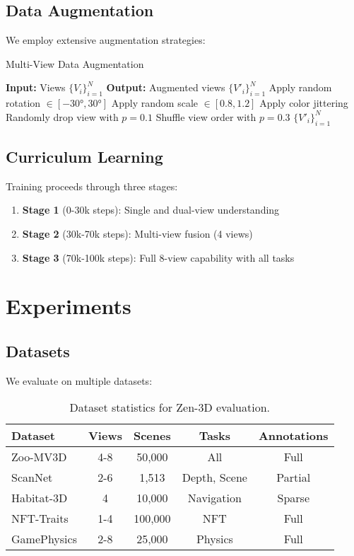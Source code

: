 \documentclass[11pt,a4paper]{article}
\begin{document}
\subsection{Data Augmentation}

We employ extensive augmentation strategies:

\begin{algorithm}
\caption{Multi-View Data Augmentation}
\begin{algorithmic}
\STATE \textbf{Input:} Views $\{V_i\}_{i=1}^N$
\STATE \textbf{Output:} Augmented views $\{V'_i\}_{i=1}^N$
    \STATE Apply random rotation $\in [-30°, 30°]$
    \STATE Apply random scale $\in [0.8, 1.2]$
    \STATE Apply color jittering
    \STATE Randomly drop view with $p=0.1$
\ENDFOR
\STATE Shuffle view order with $p=0.3$
\RETURN $\{V'_i\}_{i=1}^N$
\end{algorithmic}
\end{algorithm}

\subsection{Curriculum Learning}

Training proceeds through three stages:

\begin{enumerate}
    \item \textbf{Stage 1} (0-30k steps): Single and dual-view understanding
    \item \textbf{Stage 2} (30k-70k steps): Multi-view fusion (4 views)
    \item \textbf{Stage 3} (70k-100k steps): Full 8-view capability with all tasks
\end{enumerate}

\section{Experiments}

\subsection{Datasets}

We evaluate on multiple datasets:

\begin{table}[h]
\centering
\begin{tabular}{lcccc}
\toprule
Dataset & Views & Scenes & Tasks & Annotations \\
\midrule
Zoo-MV3D & 4-8 & 50,000 & All & Full \\
ScanNet & 2-6 & 1,513 & Depth, Scene & Partial \\
Habitat-3D & 4 & 10,000 & Navigation & Sparse \\
NFT-Traits & 1-4 & 100,000 & NFT & Full \\
GamePhysics & 2-8 & 25,000 & Physics & Full \\
\bottomrule
\end{tabular}
\caption{Dataset statistics for Zen-3D evaluation.}
\end{table}
\end{document}
